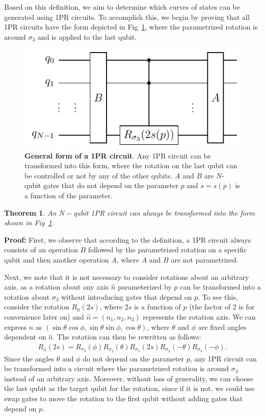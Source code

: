\documentclass[10pt,letterpaper]{article} %
\newcommand{\fref}[1]{Fig~\ref{#1}}
\newtheorem{theorem}{Theorem}
\begin{document}
Based on this definition, we aim to determine which curves of 
states can be generated using 1PR circuits. 
To accomplish this, we begin by proving that all 1PR circuits have 
the form depicted in \fref{Fig4},
where the parametrized rotation is around $\sigma_3$ and
is applied to the last qubit.

\begin{figure} %
\centering
\includegraphics{OPR-circuit.pdf}
\caption{\textbf{General form of a 1PR circuit}.
Any 1PR circuit can be transformed into this form,
where the rotation on the last qubit
can be controlled or not by any of the other qubits.
$A$ and $B$
are $N$-qubit gates that do not depend on the parameter $p$ and
$s= s(p)$ is a function of the parameter.}
\label{Fig4}
\end{figure} %

\begin{theorem}
An $N-$qubit 1PR circuit can always be transformed 
into the form shown in \fref{Fig4}.
\end{theorem}
\textbf{Proof:} 
First, we observe that according to the
definition, a 1PR circuit always consists of an operation $B$ followed 
by the parametrized rotation on a specific qubit and then another operation $A$, 
where $A$ and $B$ are not parametrized.

Next, we note that it is not necessary to consider rotations about an arbitrary axis,
as a rotation about any axis $\hat{n}$ parameterized by $p$
can be transformed into a rotation about $\sigma_3$ without introducing 
gates that depend on $p$. To see this, consider the rotation $R_{\hat{n}}(2s)$, where $2s$ 
is a function of $p$ (the factor of 2 is for convenience later on) 
and $\hat{n} = (n_1,n_2,n_3)$ represents the rotation axis. 
We can express $\hat{n}$ as $(\sin \theta \cos \phi, \sin \theta \sin \phi, \cos \theta)$, 
where $\theta$ and $\phi$ are fixed angles dependent on $\hat{n}$. 
The rotation can then be rewritten as follows:
\begin{eqnarray}
R_{\hat{n}}(2s) = R_{\sigma_3}(\phi) R_{\sigma_2}(\theta) R_{\sigma_3}(2s) R_{\sigma_2}(-\theta) R_{\sigma_3}(-\phi).
\end{eqnarray}
Since the angles $\theta$ and $\phi$ do not depend on the parameter $p$,
any 1PR circuit can be transformed into a circuit where the parametrized
 rotation is around $\sigma_3$ instead of an arbitrary axis. 
Moreover, without loss of generality, we can choose the last qubit as the
target qubit for the rotation, since if it is not, we could use
swap gates to move the rotation
to the first qubit without adding gates
that depend on $p$. 
\end{document}
